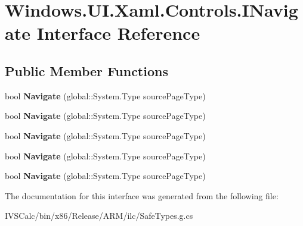 \hypertarget{interface_windows_1_1_u_i_1_1_xaml_1_1_controls_1_1_i_navigate}{}\section{Windows.\+U\+I.\+Xaml.\+Controls.\+I\+Navigate Interface Reference}
\label{interface_windows_1_1_u_i_1_1_xaml_1_1_controls_1_1_i_navigate}
\subsection*{Public Member Functions}
\begin{DoxyCompactItemize}
\item 
\mbox{\label{interface_windows_1_1_u_i_1_1_xaml_1_1_controls_1_1_i_navigate_aef12b0506553421b09b7a2d8352e23b4}} 
bool {\bfseries Navigate} (global\+::\+System.\+Type source\+Page\+Type)
\item 
\mbox{\label{interface_windows_1_1_u_i_1_1_xaml_1_1_controls_1_1_i_navigate_aef12b0506553421b09b7a2d8352e23b4}} 
bool {\bfseries Navigate} (global\+::\+System.\+Type source\+Page\+Type)
\item 
\mbox{\label{interface_windows_1_1_u_i_1_1_xaml_1_1_controls_1_1_i_navigate_aef12b0506553421b09b7a2d8352e23b4}} 
bool {\bfseries Navigate} (global\+::\+System.\+Type source\+Page\+Type)
\item 
\mbox{\label{interface_windows_1_1_u_i_1_1_xaml_1_1_controls_1_1_i_navigate_aef12b0506553421b09b7a2d8352e23b4}} 
bool {\bfseries Navigate} (global\+::\+System.\+Type source\+Page\+Type)
\item 
\mbox{\label{interface_windows_1_1_u_i_1_1_xaml_1_1_controls_1_1_i_navigate_aef12b0506553421b09b7a2d8352e23b4}} 
bool {\bfseries Navigate} (global\+::\+System.\+Type source\+Page\+Type)
\end{DoxyCompactItemize}


The documentation for this interface was generated from the following file\+:\begin{DoxyCompactItemize}
\item 
I\+V\+S\+Calc/bin/x86/\+Release/\+A\+R\+M/ilc/Safe\+Types.\+g.\+cs\end{DoxyCompactItemize}
